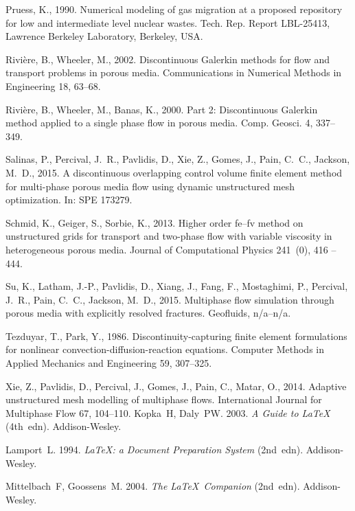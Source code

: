 \documentclass[times]{fldauth}
\begin{document}
\begin{thebibliography}{9}
Pruess, K., 1990. Numerical modeling of gas migration at a proposed repository
  for low and intermediate level nuclear wastes. Tech. Rep. Report LBL-25413,
  Lawrence Berkeley Laboratory, Berkeley, USA.

Rivi\`ere, B., Wheeler, M., 2002. Discontinuous {G}alerkin methods for flow and
  transport problems in porous media. Communications in Numerical Methods in
  Engineering 18, 63--68.

Rivi\`ere, B., Wheeler, M., Banas, K., 2000. Part 2: Discontinuous {G}alerkin
  method applied to a single phase flow in porous media. Comp. Geosci. 4,
  337--349.

Salinas, P., Percival, J.~R., Pavlidis, D., Xie, Z., Gomes, J., Pain, C.~C.,
  Jackson, M.~D., 2015. A discontinuous overlapping control volume finite
  element method for multi-phase porous media flow using dynamic unstructured
  mesh optimization. In: SPE 173279.

Schmid, K., Geiger, S., Sorbie, K., 2013. Higher order fe–fv method on
  unstructured grids for transport and two-phase flow with variable viscosity
  in heterogeneous porous media. Journal of Computational Physics 241~(0), 416
  -- 444.

Su, K., Latham, J.-P., Pavlidis, D., Xiang, J., Fang, F., Mostaghimi, P.,
  Percival, J.~R., Pain, C.~C., Jackson, M.~D., 2015. Multiphase flow
  simulation through porous media with explicitly resolved fractures.
  Geofluids, n/a--n/a.

Tezduyar, T., Park, Y., 1986. Discontinuity-capturing finite element
  formulations for nonlinear convection-diffusion-reaction equations. Computer
  Methods in Applied Mechanics and Engineering 59, 307--325.

Xie, Z., Pavlidis, D., Percival, J., Gomes, J., Pain, C., Matar, O., 2014.
  Adaptive unstructured mesh modelling of multiphase flows. International
  Journal for Multiphase Flow 67, 104--110.
%
 Kopka~H, Daly~PW. 2003. \emph{A Guide to \LaTeX} (4th~edn).
Addison-Wesley.

 Lamport~L. 1994. \emph{\LaTeX: a Document Preparation System} (2nd~edn).
Addison-Wesley.

 Mittelbach~F, Goossens~M. 2004. \emph{The \LaTeX\ Companion}
(2nd~edn). Addison-Wesley.
\end{thebibliography}
\end{document}
